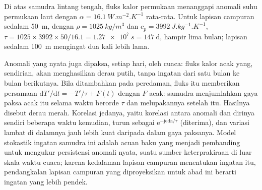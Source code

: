 \begin{example}\label{ex:b2:climate-variability:tau}
Di atas samudra lintang tengah, fluks kalor permukaan menanggapi anomali suhu permukaan laut
dengan $\alpha = \qty{16.1}{W.m^{-2}.K^{-1}}$ rata-rata. Untuk lapisan campuran
sedalam \qty{50}{m}, dengan $\rho = \qty{1025}{kg/m^3}$ dan $c_p = \qty{3992}{J.kg^{-1}.K^{-1}}$,
$\tau = 1025 \times 3992 \times 50/16.1 = \qty{1.27e7}{s} = \qty{147}{\day}$, hampir lima
bulan; lapisan sedalam \qty{100}{m} mengingat dua kali lebih lama.
\end{example}

Anomali yang nyata juga dipaksa, setiap hari, oleh cuaca: fluks kalor acak yang, sendirian,
akan menghasilkan derau putih, tanpa ingatan dari satu bulan ke bulan berikutnya. Bila ditambahkan pada peredaman, fluks itu
memberikan persamaan $\mathrm{d}T'/\mathrm{d}t = -T'/\tau + F(t)$ dengan $F$ acak: samudra menjumlahkan
gaya paksa acak itu selama waktu berorde $\tau$ dan melupakannya setelah itu. Hasilnya disebut
derau merah. Korelasi jedanya, yaitu korelasi antara anomali dan dirinya sendiri beberapa waktu kemudian,
turun sebagai $\mathrm{e}^{-\text{jeda}/\tau}$ (diterima), dan variasi lambat di dalamnya jauh lebih kuat
daripada dalam gaya paksanya. Model stokastik ingatan samudra ini adalah acuan baku yang
menjadi pembanding untuk mengukur persistensi anomali nyata, suatu sumber keterprakiraan di luar
skala waktu cuaca; karena kedalaman lapisan campuran menentukan ingatan itu, pendangkalan
lapisan campuran yang diproyeksikan untuk abad ini berarti ingatan yang lebih pendek.

